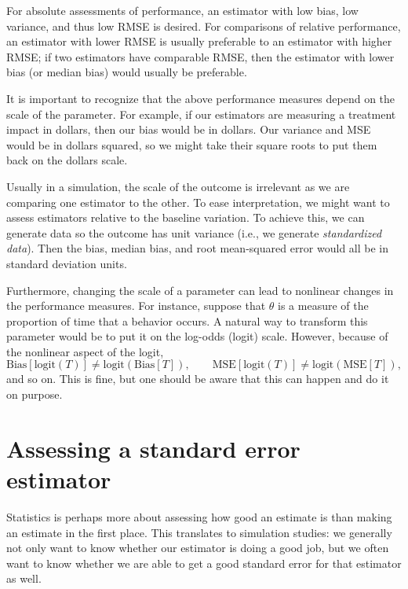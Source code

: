 \documentclass[
]{book}
\begin{document}
For absolute assessments of performance, an estimator with low bias, low variance, and thus low RMSE is desired.
For comparisons of relative performance, an estimator with lower RMSE is usually preferable to an estimator with higher RMSE; if two estimators have comparable RMSE, then the estimator with lower bias (or median bias) would usually be preferable.

It is important to recognize that the above performance measures depend on the scale of the parameter.
For example, if our estimators are measuring a treatment impact in dollars, then our bias would be in dollars.
Our variance and MSE would be in dollars squared, so we might take their square roots to put them back on the dollars scale.

Usually in a simulation, the scale of the outcome is irrelevant as we are comparing one estimator to the other.
To ease interpretation, we might want to assess estimators relative to the baseline variation.
To achieve this, we can generate data so the outcome has unit variance (i.e., we generate \emph{standardized data}).
Then the bias, median bias, and root mean-squared error would all be in standard deviation units.

Furthermore, changing the scale of a parameter can lead to nonlinear changes in the performance measures.
For instance, suppose that \(\theta\) is a measure of the proportion of time that a behavior occurs.
A natural way to transform this parameter would be to put it on the log-odds (logit) scale.
However, because of the nonlinear aspect of the logit,
\[\text{Bias}\left[\text{logit}(T)\right] \neq \text{logit}\left(\text{Bias}[T]\right), \qquad \text{MSE}\left[\text{logit}(T)\right] \neq \text{logit}\left(\text{MSE}[T]\right),\]
and so on.
This is fine, but one should be aware that this can happen and do it on purpose.

\hypertarget{assessing-a-standard-error-estimator}{%
\section{Assessing a standard error estimator}\label{assessing-a-standard-error-estimator}}

Statistics is perhaps more about assessing how good an estimate is than making an estimate in the first place.
This translates to simulation studies: we generally not only want to know whether our estimator is doing a good job, but we often want to know whether we are able to get a good standard error for that estimator as well.
\end{document}
